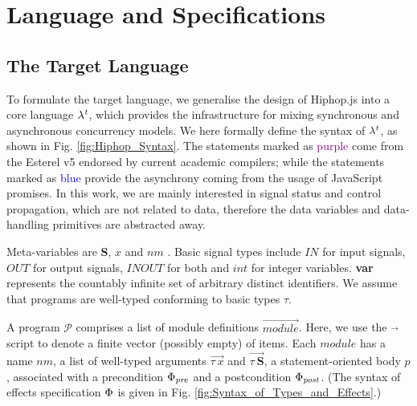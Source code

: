 \documentclass[acmsmall,10pt,review]{acmart}
\newcommand{\effect}{\textcolor{black}{\ensuremath{\mathrm{\Phi}}}}
\newcommand{\code}[1]{{\tt{\ensuremath{\m{#1}}}}}
\newcommand{\m}{\mathit}
\newcommand\figref[1]{Fig. \textcolor{black}{\ref{#1}}.}
\newcommand{\timedL}{\code{\lambda^{t}}}
\begin{document}
{\section{Language and Specifications}
\label{sec:LanguageSpecifications}

\subsection{The Target Language}
\label{subsec:Targetlanguage}

To formulate the target language, we generalise the design of  Hiphop.js into a core language \code{\timedL}, 
which provides the infrastructure for mixing synchronous and asynchronous concurrency models. 
We here formally define the syntax of \code{\timedL}, as shown in \figref{fig:Hiphop_Syntax} The statements marked as \textcolor{purple} {purple} come from the  Esterel v5 \cite{berry1999constructive,berry2esterel} endorsed by current academic compilers; while the statements marked as \textcolor{blue} {blue} provide the asynchrony coming from the usage of JavaScript promises. 
In this work, we are mainly interested in signal status and control propagation, which are not related to data, therefore the data variables and data-handling primitives are abstracted away. 


Meta-variables are {\textbf{S}}, \code{x} and \code{nm} . Basic signal types include \code{IN} for input signals, \code{OUT} for output signals, \code{INOUT} for both and \code{int} for integer variables. {\textbf{var}} represents the countably infinite set of arbitrary distinct identifiers. We assume that programs are well-typed conforming to basic types \code{\tau}. 

A program \code{\mathcal{P} } comprises a list of module definitions \code{ \overrightarrow{module}}. Here, we use the \code{ \overrightarrow{}} script to denote a finite vector (possibly empty) of items.
Each \code{module} has a name \code{nm}, a list of well-typed arguments \code{ \overrightarrow{\tau\ x} } and $ \overrightarrow{\tau\ \textbf{S}}$, a statement-oriented body \code{{p}}, associated with a precondition \code{\effect_{pre}} and a postcondition \code{\effect_{post}}. (The syntax of effects specification \code{\effect} is given in \figref{fig:Syntax_of_Types_and_Effects})



}
\end{document}
